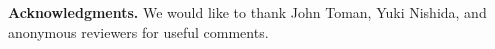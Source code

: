 \vspace{6mm}
{\bf{Acknowledgments.}}
We would like to thank John Toman, Yuki Nishida, and anonymous reviewers for useful comments.